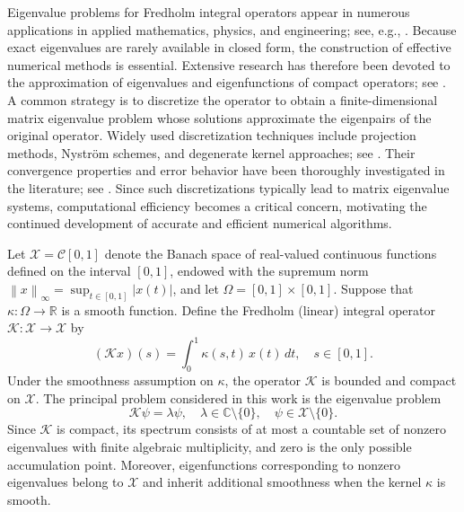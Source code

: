 \documentclass[]{interact}
\theoremstyle{plain}%
\theoremstyle{definition}
\theoremstyle{remark}
\newcommand{\norm}[1]{\left\lVert #1\right\rVert}
\begin{document}

Eigenvalue problems for Fredholm integral operators appear in numerous applications in applied mathematics, physics, and engineering; see, e.g., \cite{Chatelin, Chen1997}. 
Because exact eigenvalues are rarely available in closed form, the construction of effective numerical methods is essential. Extensive research has therefore been devoted to the approximation of eigenvalues and eigenfunctions of compact operators; see \cite{Ahues, Atkinson1967, Atkinson1975, Babuska1987, Babuska1989, Bramble1973, Osborn, Sloan1}. 
A common strategy is to discretize the operator to obtain a finite-dimensional matrix eigenvalue problem whose solutions approximate the eigenpairs of the original operator.
Widely used discretization techniques include projection methods, Nystr\"om schemes, and degenerate kernel approaches; see \cite{KEA0, KEA-IG-IS, Cha-Leb2, Gnan1, Pallav2002}. Their convergence properties and error behavior have been thoroughly investigated in the literature; see \cite{Chatelin, Kato1976, Osborn, Atkinson1975}. Since such discretizations typically lead to matrix eigenvalue systems, computational efficiency becomes a critical concern, motivating the continued development of accurate and efficient numerical algorithms.


Let $\mathcal{X} = \mathcal{C}[0,1]$ denote the Banach space of real-valued continuous functions defined on the interval $[0,1]$, endowed with the supremum norm
$\norm{x}_\infty = \sup_{t \in [0,1]} |x(t)|$, and let $\Omega = [0,1]\times[0,1]$.  
Suppose that $\kappa : \Omega \to \mathbb{R}$ is a smooth function. Define the Fredholm (linear) integral operator $\mathcal{K} : \mathcal{X} \to \mathcal{X}$ by
\begin{equation} \label{Eq:01}
	(\mathcal{K}x)(s)
	=
	\int_0^1 \kappa(s,t)\,x(t)\,dt,
	\quad s \in [0,1].
\end{equation}
Under the smoothness assumption on $\kappa$, the operator $\mathcal{K}$ is bounded and compact on $\mathcal{X}$. The principal problem considered in this work is the eigenvalue problem
\begin{equation} \label{Eq:02}
	\mathcal{K}\psi = \lambda \psi,
	\quad 
	\lambda \in \mathbb{C}\setminus\{0\},
	\quad 
	\psi \in \mathcal{X}\setminus\{0\}.
\end{equation}
Since $\mathcal{K}$ is compact, its spectrum consists of at most a countable set of nonzero eigenvalues with finite algebraic multiplicity, and zero is the only possible accumulation point. Moreover, eigenfunctions corresponding to nonzero eigenvalues belong to $\mathcal{X}$ and inherit additional smoothness when the kernel $\kappa$ is smooth.
\end{document}
